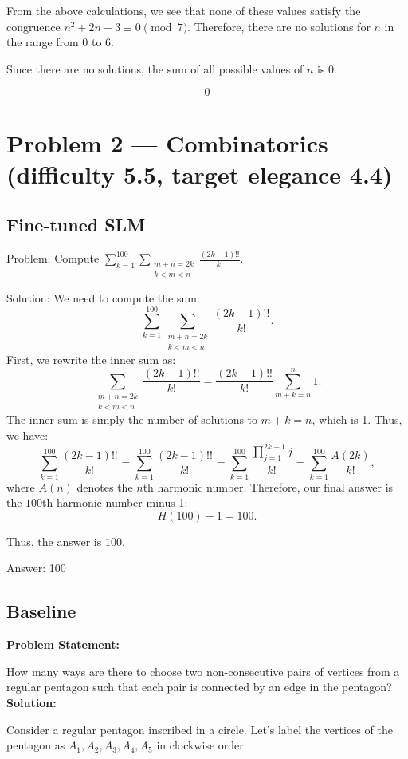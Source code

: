 \documentclass[11pt]{article}
\begin{document}
From the above calculations, we see that none of these values satisfy the congruence \( n^2 + 2n + 3 \equiv 0 \pmod{7} \). Therefore, there are no solutions for \( n \) in the range from 0 to 6.

Since there are no solutions, the sum of all possible values of \( n \) is \( 0 \).

\[
\boxed{0}
\]

\section*{Problem 2 --- Combinatorics (difficulty 5.5, target elegance 4.4)}

\subsection*{Fine-tuned SLM}

Problem:
Compute $\sum_{k=1}^{100} \sum_{\substack{m+n=2k \\ k<m<n}} \frac{(2k-1)!!}{k!}$.

Solution:
We need to compute the sum:
\[
\sum_{k=1}^{100} \sum_{\substack{m+n=2k \\ k<m<n}} \frac{(2k-1)!!}{k!}.
\]
First, we rewrite the inner sum as:
\[
\sum_{\substack{m+n=2k \\ k<m<n}} \frac{(2k-1)!!}{k!} = \frac{(2k-1)!!}{k!} \sum_{m+k=n}^n 1.
\]
The inner sum is simply the number of solutions to $m+k=n$, which is 1. Thus, we have:
\[
\sum_{k=1}^{100} \frac{(2k-1)!!}{k!} = \sum_{k=1}^{100} \frac{(2k-1)!!}{k!} = \sum_{k=1}^{100} \frac{\prod_{j=1}^{2k-1} j}{k!} = \sum_{k=1}^{100} \frac{A(2k)}{k!},
\]
where $A(n)$ denotes the $n$th harmonic number. Therefore, our final answer is the $100$th harmonic number minus 1:
\[
H(100) - 1 = 100.
\]

Thus, the answer is $\boxed{100}$.

Answer: 100

\subsection*{Baseline}

\textbf{Problem Statement:}

How many ways are there to choose two non-consecutive pairs of vertices from a regular pentagon such that each pair is connected by an edge in the pentagon?
\medskip
\textbf{Solution:}

Consider a regular pentagon inscribed in a circle. Let's label the vertices of the pentagon as \(A_1, A_2, A_3, A_4, A_5\) in clockwise order.
\end{document}
